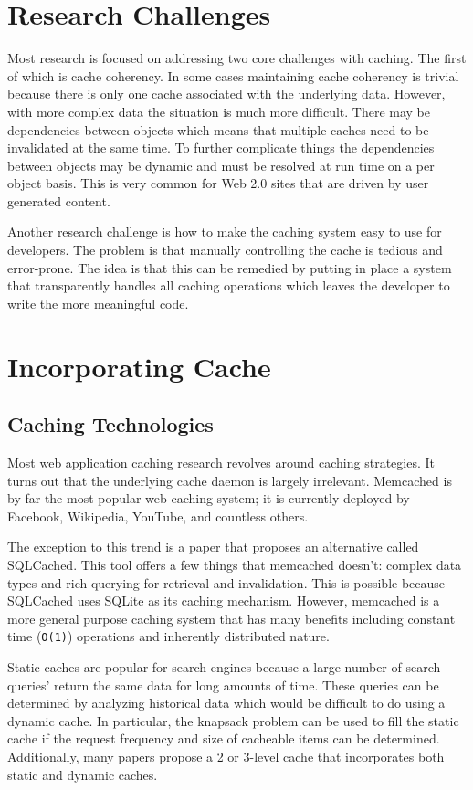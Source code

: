 \documentclass[12pt]{article}
\begin{document}
\section{Research Challenges}
Most research is focused on addressing two core challenges with caching.
The first of which is cache coherency.
In some cases maintaining cache coherency is trivial because there is only one cache associated with the underlying data.
However, with more complex data the situation is much more difficult.
There may be dependencies between objects which means that multiple caches need to be invalidated at the same time.
To further complicate things the dependencies between objects may be dynamic and must be resolved at run time on a per object basis.
This is very common for Web 2.0 sites that are driven by user generated content.

Another research challenge is how to make the caching system easy to use for developers.
The problem is that manually controlling the cache is tedious and error-prone.
The idea is that this can be remedied by putting in place a system that transparently handles all caching operations which leaves the developer to write the more meaningful code.

\section{Incorporating Cache}
\subsection{Caching Technologies}
Most web application caching research revolves around caching strategies.
It turns out that the underlying cache daemon is largely irrelevant.
Memcached is by far the most popular web caching system; it is currently deployed by Facebook, Wikipedia, YouTube, and countless others.\cite{memcachedDotOrg}

The exception to this trend is a paper that proposes an alternative called SQLCached.\cite{sqlCached}
This tool offers a few things that memcached doesn't: complex data types and rich querying for retrieval and invalidation.
This is possible because SQLCached uses SQLite as its caching mechanism.
However, memcached is a more general purpose caching system that has many benefits including constant time ({\tt O(1)}) operations and inherently distributed nature.\cite{memcachedDotOrg}

Static caches are popular for search engines because a large number of search queries' return the same data for long amounts of time.
These queries can be determined by analyzing historical data which would be difficult to do using a dynamic cache.\cite{designTradeOffsSearchEngine}
In particular, the knapsack problem can be used to fill the static cache if the request frequency and size of cacheable items can be determined.\cite{designTradeOffsSearchEngine}
Additionally, many papers propose a 2 or 3-level cache that incorporates both static and dynamic caches.\cite{cacheAdmissionPolicies}\cite{designTradeOffsSearchEngine}
\end{document}
